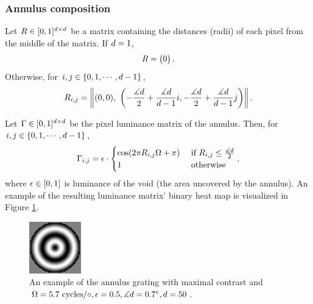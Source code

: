 \subsubsection{Annulus composition}
\label{sec:annulus-composition}

Let $R \in [0, 1]^{d \times d}$ be a matrix containing the distances (radii) of each pixel from the middle of the matrix. If $d = 1$,
\begin{equation}
    R = 
    \begin{pmatrix}
        0
    \end{pmatrix}.
\end{equation}
Otherwise, for $i, j \in \{ 0, 1, \cdots,  d-1 \}$,
\begin{equation}
    \annradii_{i, j} = \left\| 
        (0, 0), \ 
        \left(
            -\frac{\diamdg}{2} + \frac{\diamdg}{\diam - 1} i, 
            -\frac{\diamdg}{2} + \frac{\diamdg}{\diam - 1} j 
        \right) 
    \right\|.
\end{equation}

Let $\Gamma \in [0, 1]^{d \times d}$ be the pixel luminance matrix of the annulus. Then, for $i, j \in \{ 0, 1, \cdots,  d-1 \}$,
\begin{equation}
    \Gamma_{i, j} = \epsilon \cdot
    \begin{cases}
        \cos(2 \pi R_{i, j} \Omega + \pi) 
        &\text{ if } R_{i, j} \leq \frac{\measuredangle d}{2} \\
        1 
        &\text{ otherwise}
    \end{cases},
    \label{eq:grating}
\end{equation}
where $\epsilon \in [0, 1]$ is luminance of the void (the area uncovered by the annulus).
An example of the resulting luminance matrix' binary heat map is visualized in Figure \ref{fig:grating-example}.

\begin{figure}[!htp]
    \centering
    \includegraphics[width=0.2\textwidth]{assets/images/grating.png}
    \caption{An example of the annulus grating with maximal contrast and $\Omega = 5.7 \text{ cycles}/\circ, \epsilon = 0.5, \measuredangle d = 0.7^\circ, d = 50$.}
    \label{fig:grating-example}
\end{figure}